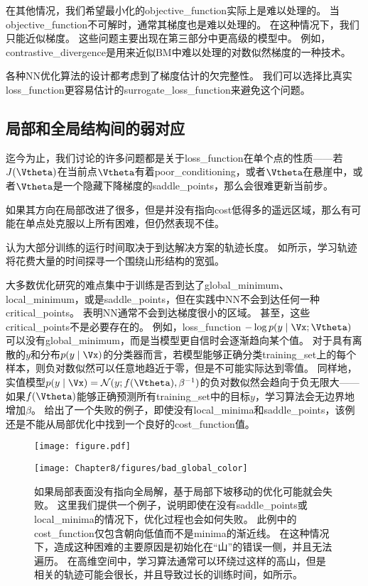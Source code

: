 在其他情况，我们希望最小化的\gls{objective_function}实际上是难以处理的。
当\gls{objective_function}不可解时，通常其梯度也是难以处理的。
在这种情况下，我们只能近似梯度。
这些问题主要出现在第三部分中更高级的模型中。
例如，\gls{contrastive_divergence}是用来近似\gls{BM}中难以处理的对数似然梯度的一种技术。


各种\gls{NN}优化算法的设计都考虑到了梯度估计的欠完整性。
我们可以选择比真实\gls{loss_function}更容易估计的\gls{surrogate_loss_function}来避免这个问题。


\subsection{局部和全局结构间的弱对应}
\label{sec:poor_correspondence_between_local_and_global_structure}
迄今为止，我们讨论的许多问题都是关于\gls{loss_function}在单个点的性质——若$J(\Vtheta)$在当前点$\Vtheta$有着\gls{poor_conditioning}，或者$\Vtheta$在悬崖中，或者$\Vtheta$是一个隐藏下降梯度的\gls{saddle_points}，那么会很难更新当前步。


如果其方向在局部改进了很多，但是并没有指向\gls{cost}低得多的遥远区域，那么有可能在单点处克服以上所有困难，但仍然表现不佳。


\cite{GoodfellowOptimization15}认为大部分训练的运行时间取决于到达解决方案的轨迹长度。 
如所示，学习轨迹将花费大量的时间探寻一个围绕山形结构的宽弧。


大多数优化研究的难点集中于训练是否到达了\gls{global_minimum}、\gls{local_minimum}，或是\gls{saddle_points}，但在实践中\gls{NN}不会到达任何一种\gls{critical_points}。
表明\gls{NN}通常不会到达梯度很小的区域。
甚至，这些\gls{critical_points}不是必要存在的。
例如，\gls{loss_function} $-\log p(y\mid\Vx;\Vtheta)$ 可以没有\gls{global_minimum}，而是当模型更自信时会逐渐趋向某个值。    
对于具有离散的$y$和分布$p(y\mid\Vx)$的分类器而言，若模型能够正确分类\gls{training_set}上的每个样本，则负对数似然可以任意地趋近于零，但是不可能实际达到零值。
同样地，实值模型$p(y\mid\Vx) = \mathcal{N}(y;f(\Vtheta),\beta^{-1})$的负对数似然会趋向于负无限大——如果$f(\Vtheta)$能够正确预测所有\gls{training_set}中的目标$y$，学习算法会无边界地增加$\beta$。
给出了一个失败的例子，即使没有\gls{local_minima}和\gls{saddle_points}，该例还是不能从局部优化中找到一个良好的\gls{cost_function}值。


\begin{figure}[!htb]
\ifOpenSource
\centerline{\texttt{[image: figure.pdf]}}
\else
\centerline{\texttt{[image: Chapter8/figures/bad\_global\_color]}}
\fi
\caption{如果局部表面没有指向全局解，基于局部下坡移动的优化可能就会失败。
这里我们提供一个例子，说明即使在没有\gls{saddle_points}或\gls{local_minima}的情况下，优化过程也会如何失败。
此例中的\gls{cost_function}仅包含朝向低值而不是\gls{minima}的渐近线。
在这种情况下，造成这种困难的主要原因是初始化在``山''的错误一侧，并且无法遍历。
在高维空间中，学习算法通常可以环绕过这样的高山，但是相关的轨迹可能会很长，并且导致过长的训练时间，如所示。
}
\label{fig:chap8_bad_global}
\end{figure}



